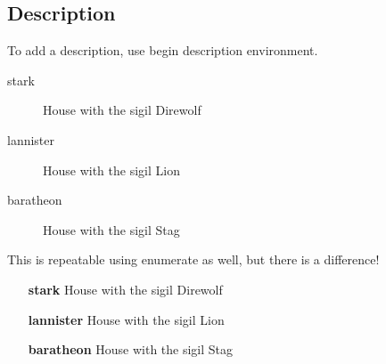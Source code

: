 \documentclass[10pt,a4paper]{article}
\begin{document}
\subsection{Description}

To add a description, use begin description environment.

\begin{description}
\item [stark] House with the sigil Direwolf
\item [lannister] House with the sigil Lion
\item [baratheon] House with the sigil Stag
\end{description}

This is repeatable using enumerate as well, but there is a difference!

\begin{enumerate}
\item [\textbf{stark}] House with the sigil Direwolf
\item [\textbf{lannister}] House with the sigil Lion
\item [\textbf{baratheon}] House with the sigil Stag
\end{enumerate}
\end{document}

